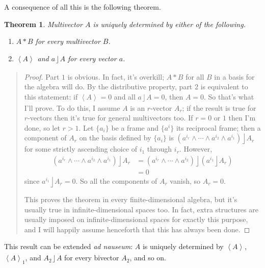\documentclass{utarticle}
\DeclareMathOperator{\lin}{\rfloor}
\DeclareMathOperator{\out}{\wedge}
\newcommand{\scprod}[2]{\ensuremath{#1 * #2}}
\newcommand{\grade}[2][]{\ensuremath{\left\langle #2 \right\rangle_{#1}}}
\newtheorem{thm}{Theorem}
\newcommand{\bp}{\begin{quotation} \begin{proof}}
\newcommand{\ep}{\end{proof} \end{quotation}}
\begin{document}
A consequence of all this is the following theorem.
\begin{thm}
Multivector $A$ is uniquely determined by either of the following.
\begin{enumerate}
\item \scprod{A}{B} for every multivector $B$.
\item \grade{A} and $a \lin A$ for every vector $a$.
\end{enumerate}
\label{Afromscprods}
\end{thm}
\bp
Part $1$ is obvious.  In fact, it's overkill; \scprod{A}{B} for all $B$ in a basis for the 
algebra will do.  By the distributive property, part $2$ is equivalent to this statement: 
if $\grade{A}=0$ and all $a \lin A = 0$, then $A=0$.  So that's what I'll prove.  To do 
this, I assume $A$ is an $r$-vector $A_r$; if the result is true for $r$-vectors then it's 
true for general multivectors too.  If $r=0$ or $1$ then I'm done, so let $r > 1$.  Let 
$\{a_i\}$ be a frame and $\{a^i\}$ its reciprocal frame; then a component of $A_r$ 
on the basis defined by $\{a_i\}$ is $(a^{i_r} \out \dotsb \out a^{i_2} \out a^{i_1}) 
\lin A_r$ for some strictly ascending choice of $i_1$ through $i_r$.  However, 
\begin{align}
(a^{i_r} \out \dotsb \out a^{i_2} \out a^{i_1}) \lin A_r 
                   & = (a^{i_r} \out \dotsb \out a^{i_2}) \lin (a^{i_1} \lin A_r) \nonumber \\
                                                                       & = 0
\end{align}
since $a^{i_1} \lin A_r=0$.  So all the components of $A_r$ vanish, so $A_r=0$.

This proves the theorem in every finite-dimensional algebra, but it's usually 
true in infinite-dimensional spaces too.  In fact, extra structures are usually 
imposed on infinite-dimensional spaces for exactly this purpose, and I will 
happily assume henceforth that this has always been done.
\ep
This result can be extended \textit{ad nauseum}: $A$ is uniquely determined by 
\grade{A}, \grade[1]{A}, and $A_2 \lin A$ for every bivector $A_2$, and so on.
\end{document}
